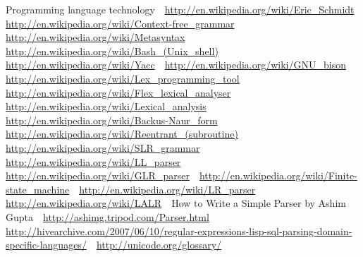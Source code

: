 Programming language technology
\newline 
\url{http://en.wikipedia.org/wiki/Eric_Schmidt}
\newline 
\url{http://en.wikipedia.org/wiki/Context-free_grammar}
\newline 
\url{http://en.wikipedia.org/wiki/Metasyntax}
\newline 
\url{http://en.wikipedia.org/wiki/Bash_(Unix_shell)}
\newline 
\url{http://en.wikipedia.org/wiki/Yacc}
\newline 
\url{http://en.wikipedia.org/wiki/GNU_bison}
\newline 
\url{http://en.wikipedia.org/wiki/Lex_programming_tool}
\newline 
\url{http://en.wikipedia.org/wiki/Flex_lexical_analyser}
\newline 
\url{http://en.wikipedia.org/wiki/Lexical_analysis}
\newline 
\url{http://en.wikipedia.org/wiki/Backus-Naur_form}
\newline 
\url{http://en.wikipedia.org/wiki/Reentrant_(subroutine)}
\newline 
\url{http://en.wikipedia.org/wiki/SLR_grammar}
\newline 
\url{http://en.wikipedia.org/wiki/LL_parser}
\newline 
\url{http://en.wikipedia.org/wiki/GLR_parser}
\newline 
\url{http://en.wikipedia.org/wiki/Finite-state_machine}
\newline 
\url{http://en.wikipedia.org/wiki/LR_parser}
\newline 
\url{http://en.wikipedia.org/wiki/LALR}
\newline 
How to Write a Simple Parser by Ashim Gupta
\newline 
\url{http://ashimg.tripod.com/Parser.html}
\newline 
\url{http://hivearchive.com/2007/06/10/regular-expressions-lisp-sql-parsing-domain-specific-languages/}
\newline 
\url{http://unicode.org/glossary/}


